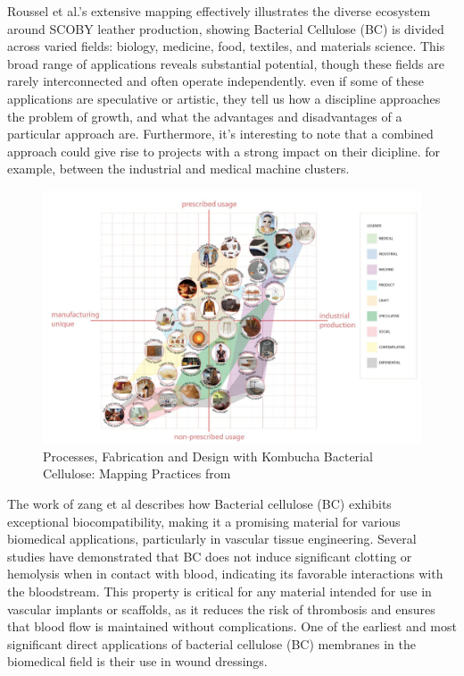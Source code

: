 Roussel et al.'s extensive mapping\cite{roussel2023processes} effectively illustrates the diverse ecosystem around SCOBY leather production, showing Bacterial Cellulose (BC) is divided across varied fields: biology, medicine, food, textiles, and materials science. This broad range of applications reveals substantial potential, though these fields are rarely interconnected and often operate independently.
even if some of these applications are speculative or artistic, they tell us how a discipline approaches the problem of growth, and what the advantages and disadvantages of a particular approach are. Furthermore, it's interesting to note that a combined approach could give rise to projects with a strong impact on their dicipline. for example, between the industrial and medical machine clusters. 
\begin{figure}
    \centering
    \includegraphics[width=1.4\textwidth]{images/mapping-practices-kombu.png} %
    \caption{Processes, Fabrication and Design with Kombucha Bacterial Cellulose: Mapping Practices from\cite{roussel2023processes}}
    \label{fig:graph-vivien}
\end{figure}




The work of zang et al\cite{zang2015investigation} describes how Bacterial cellulose (BC) exhibits exceptional biocompatibility, making it a promising material for various biomedical applications, particularly in vascular tissue engineering. Several studies have demonstrated that BC does not induce significant clotting or hemolysis when in contact with blood, indicating its favorable interactions with the bloodstream. This property is critical for any material intended for use in vascular implants or scaffolds, as it reduces the risk of thrombosis and ensures that blood flow is maintained without complications.
One of the earliest and most significant direct applications of bacterial cellulose (BC) membranes in the biomedical field is their use in wound dressings. 


